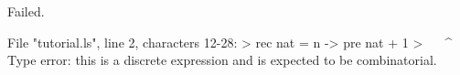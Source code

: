 \runverbatimfalse
{}
\begin{RunVerbatimMsg}
Failed.
\end{RunVerbatimMsg}
\begin{RunVerbatimErr}
File "tutorial.ls", line 2, characters 12-28:
>  rec nat = n -> pre nat + 1
>            ^^^^^^^^^^^^^^^^
Type error: this is a discrete expression and is expected to be combinatorial.
\end{RunVerbatimErr}
